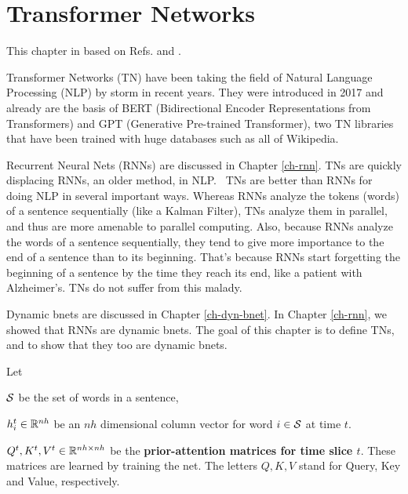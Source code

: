\chapter{Transformer Networks}
\label{ch-transformer}

This chapter in based on Refs.\cite{joshi-trans}
and \cite{wiki-transformer}.

Transformer Networks (TN)
have been taking the field of
Natural Language Processing (NLP)
by storm in recent years.
They were introduced in 2017 and already
are the basis of
BERT (Bidirectional Encoder
Representations from Transformers)
and GPT (Generative Pre-trained Transformer),
two TN libraries that
have been trained with
huge databases such as all of Wikipedia.

Recurrent Neural Nets (RNNs)
are discussed in Chapter \ref{ch-rnn}.
TNs are quickly displacing RNNs, 
an older method, in NLP.  TNs are better than RNNs 
for doing NLP in several important ways. Whereas
 RNNs analyze the tokens (words) of a sentence 
sequentially (like a Kalman Filter), 
TNs analyze them in parallel, and thus are more
 amenable to parallel computing. Also, because
 RNNs analyze the words of a sentence sequentially, 
they tend to give more importance to the end 
of a sentence than to its beginning. That's because 
RNNs start forgetting the beginning of a sentence
 by the time they reach its end, like a patient 
with Alzheimer's. TNs do not suffer from this malady.

Dynamic bnets are discussed in Chapter \ref{ch-dyn-bnet}.
In Chapter \ref{ch-rnn},
we showed that RNNs
are dynamic bnets.
The goal of
this chapter
is to define TNs,
and to show that they too are
dynamic bnets.

Let

${\cal S}$ be the
set of words in a sentence,

$h^t_i\in { \mathbb{R}}^{nh}$ be
an $nh$ dimensional column vector
for word $i\in {\cal S}$ at time $t$.

$Q^t, K^t, V^t\in { \mathbb{R}}^{nh\times nh}$
be the  {\bf prior-attention matrices for time
slice $t$}.
These matrices are learned by training
the net.
The letters $Q,K,V$ stand for
 Query, Key and Value,
respectively.


